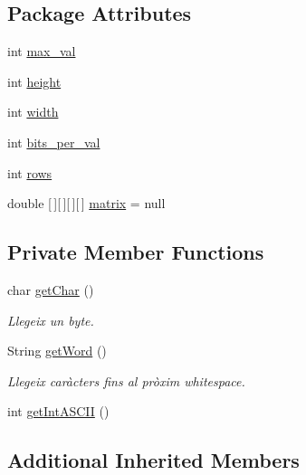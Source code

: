 \subsection*{Package Attributes}
\begin{DoxyCompactItemize}
\item 
int \hyperlink{classpersistencia_1_1input_1_1Ctrl__Input__Img_a1b8fa2d000a1d5d873be62d1f609e4be}{max\+\_\+val}
\item 
int \hyperlink{classpersistencia_1_1input_1_1Ctrl__Input__Img_abc1dcc48714e9e74fb8ae0e0b81f91bf}{height}
\item 
int \hyperlink{classpersistencia_1_1input_1_1Ctrl__Input__Img_a51dd0b9243b854aa25ac4532acca4524}{width}
\item 
int \hyperlink{classpersistencia_1_1input_1_1Ctrl__Input__Img_a222ad0e7d241e5f396cf67c3b760f143}{bits\+\_\+per\+\_\+val}
\item 
int \hyperlink{classpersistencia_1_1input_1_1Ctrl__Input__Img_a1288870f941a6730df2aadbb767f6e6f}{rows}
\item 
double \mbox{[}$\,$\mbox{]}\mbox{[}$\,$\mbox{]}\mbox{[}$\,$\mbox{]}\mbox{[}$\,$\mbox{]} \hyperlink{classpersistencia_1_1input_1_1Ctrl__Input__Img_ae61f4eb4fa38ea6dfb1e03f443711948}{matrix} = null
\end{DoxyCompactItemize}
\subsection*{Private Member Functions}
\begin{DoxyCompactItemize}
\item 
char \hyperlink{classpersistencia_1_1input_1_1Ctrl__Input__Img_a85a204b05c118b07d403e9b59d7f18c0}{get\+Char} ()
\begin{DoxyCompactList}\small\item\em Llegeix un byte. \end{DoxyCompactList}\item 
String \hyperlink{classpersistencia_1_1input_1_1Ctrl__Input__Img_a17676e8616da5821ca2323da4691d240}{get\+Word} ()
\begin{DoxyCompactList}\small\item\em Llegeix caràcters fins al pròxim whitespace. \end{DoxyCompactList}\item 
int \hyperlink{classpersistencia_1_1input_1_1Ctrl__Input__Img_a430158ff229038ddc3476d406239f4cd}{get\+Int\+A\+S\+C\+II} ()
\end{DoxyCompactItemize}
\subsection*{Additional Inherited Members}


